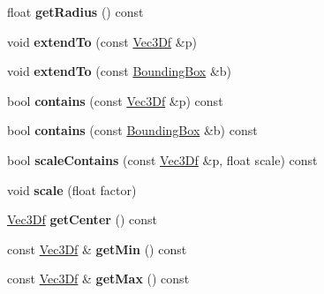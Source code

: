 \begin{DoxyCompactItemize}
\item 
\hypertarget{class_bounding_box_a8b43b3ab3ca509d5558b74d7f4899423}{
float {\bfseries getRadius} () const }
\label{class_bounding_box_a8b43b3ab3ca509d5558b74d7f4899423}

\item 
\hypertarget{class_bounding_box_a706c118cbc1abea55312761b9096bc00}{
void {\bfseries extendTo} (const \hyperlink{class_vec3_d}{Vec3Df} \&p)}
\label{class_bounding_box_a706c118cbc1abea55312761b9096bc00}

\item 
\hypertarget{class_bounding_box_af1d01d2b8b878a43e7eb484a99a54a30}{
void {\bfseries extendTo} (const \hyperlink{class_bounding_box}{BoundingBox} \&b)}
\label{class_bounding_box_af1d01d2b8b878a43e7eb484a99a54a30}

\item 
\hypertarget{class_bounding_box_aab7f3773aa3779f55a67766d8ac28488}{
bool {\bfseries contains} (const \hyperlink{class_vec3_d}{Vec3Df} \&p) const }
\label{class_bounding_box_aab7f3773aa3779f55a67766d8ac28488}

\item 
\hypertarget{class_bounding_box_ae9b938d02ca033840598ab03cab3859d}{
bool {\bfseries contains} (const \hyperlink{class_bounding_box}{BoundingBox} \&b) const }
\label{class_bounding_box_ae9b938d02ca033840598ab03cab3859d}

\item 
\hypertarget{class_bounding_box_a7522c0fca351c17de100f04a7a5430a2}{
bool {\bfseries scaleContains} (const \hyperlink{class_vec3_d}{Vec3Df} \&p, float scale) const }
\label{class_bounding_box_a7522c0fca351c17de100f04a7a5430a2}

\item 
\hypertarget{class_bounding_box_a3574993358ea575dfa5cab96f59cae58}{
void {\bfseries scale} (float factor)}
\label{class_bounding_box_a3574993358ea575dfa5cab96f59cae58}

\item 
\hypertarget{class_bounding_box_acf67cd451e1d713b91b2a64e0b3d49e1}{
\hyperlink{class_vec3_d}{Vec3Df} {\bfseries getCenter} () const }
\label{class_bounding_box_acf67cd451e1d713b91b2a64e0b3d49e1}

\item 
\hypertarget{class_bounding_box_a512de4e092aa1d13f8b79b431ec61ed6}{
const \hyperlink{class_vec3_d}{Vec3Df} \& {\bfseries getMin} () const }
\label{class_bounding_box_a512de4e092aa1d13f8b79b431ec61ed6}

\item 
\hypertarget{class_bounding_box_adf165a57276c53e0dcce8e3079e78a54}{
const \hyperlink{class_vec3_d}{Vec3Df} \& {\bfseries getMax} () const }
\label{class_bounding_box_adf165a57276c53e0dcce8e3079e78a54}


\end{DoxyCompactItemize}
